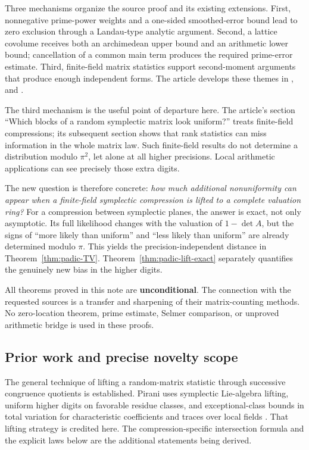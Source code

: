Three mechanisms organize the source proof and its existing extensions.
First, nonnegative prime-power weights and a one-sided smoothed-error
bound lead to zero exclusion through a Landau-type analytic argument.
Second, a lattice covolume receives both an archimedean upper bound and
an arithmetic lower bound; cancellation of a common main term produces
the required prime-error estimate. Third, finite-field matrix statistics
support second-moment arguments that produce enough independent forms.
The article develops these themes in
,  and
.

The third mechanism is the useful point of departure here.
The article's section ``Which blocks of a random symplectic matrix
look uniform?'' treats finite-field compressions; its subsequent
section shows that rank statistics can miss information in the
whole matrix law. Such finite-field results do not determine a
distribution modulo $\pi^2$, let alone at all higher precisions.
Local arithmetic applications can see precisely those extra digits.

The new question is therefore concrete: \emph{how much additional
nonuniformity can appear when a finite-field symplectic compression
is lifted to a complete valuation ring?} For a compression between
symplectic planes, the answer is exact, not only asymptotic. Its full
likelihood changes with the valuation of $1-\det A$, but the signs of
``more likely than uniform'' and ``less likely than uniform'' are
already determined modulo $\pi$. This yields the precision-independent
distance in Theorem~\ref{thm:padic-TV}. Theorem~\ref{thm:padic-lift-exact}
separately quantifies the genuinely new bias in the higher digits.

All theorems proved in this note are \textbf{unconditional}.
The connection with the requested sources is a transfer and sharpening
of their matrix-counting methods. No zero-location theorem, prime
estimate, Selmer comparison, or unproved arithmetic bridge is used
in these proofs.

\subsection{Prior work and precise novelty scope}

The general technique of lifting a random-matrix statistic through
successive congruence quotients is established. Pirani uses symplectic
Lie-algebra lifting, uniform higher digits on favorable residue classes,
and exceptional-class bounds in total variation for characteristic
coefficients and traces over local fields
\cite[Sections~8.2.1--8.2.3]{Pirani2024}. That lifting strategy is
credited here. The compression-specific intersection formula and the
explicit laws below are the additional statements being derived.

